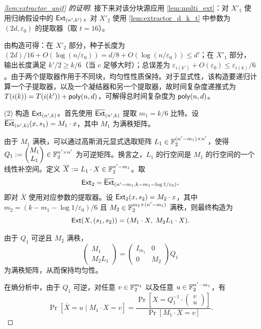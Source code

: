 \begin{proof}[\cref{lem:extractor_unif} 的证明]
    接下来对该分块源应用 \cref{lem:multi_ext}：对 $X'_1$ 使用归纳假设中的 $\mathsf{Ext}_{(n', k')}$，对 $X'_2$ 使用 \cref{lem:extractor_d_k_t} 中参数为 $(2d, \varepsilon_0)$ 的提取器（取 $t=16$）。

    由构造可得：在 $X'_2$ 部分，种子长度为 $(2d)/16 + O(\log(n/\varepsilon_0)) = d / 8 + O(\log (n / \varepsilon_0)) \le d'$；在 $X'_1$ 部分，输出长度满足 $k'/2 \ge k/6$（当 $c$ 足够大时）；总误差为 $\varepsilon_{i(k')} + O(\varepsilon_0) \le \varepsilon_{i(k)}/6$。由于两个提取器作用于不同块，均匀性性质保持。对于显式性，该构造要递归计算一个子提取器，以及一个凝结器和另一个提取器，故时间复杂度递推式为 $T(i(k)) = T(i(k')) + \mathsf{poly}(n, d)$，可解得总时间复杂度为 $\mathsf{poly}(n, d)$。

    (2) 构造 $\mathsf{Ext}_{(n', k)}$。首先使用 $\overline{\mathsf{Ext}}_{(n', k)}$ 提取 $m_1 = k/6$ 比特。设 $\overline{\mathsf{Ext}}_{(n', k)}(x, s_1) = M_1 \cdot x$，其中 $M_1$ 为满秩矩阵。

    由于 $M_1$ 满秩，可以通过高斯消元显式选取矩阵 $L_1 \in \mathbb{F}_2^{(n' - m_1) \times n'}$，使得 $Q_1 := \begin{pmatrix} M_1 \\ L_1 \end{pmatrix} \in \mathbb{F}_2^{n' \times n'}$ 为可逆矩阵。换言之，$L_1$ 的行空间是 $M_1$ 的行空间的一个线性补空间。定义 $\overline{X} := L_1 \cdot X \in \mathbb{F}_2^{n' - m_1}$。取
    $$
    \mathsf{Ext}_2 = \overline{\mathsf{Ext}}_{(n' - m_1, k - m_1 - \log 1 / \varepsilon_0)},
    $$
    即对 $\overline{X}$ 使用对应参数的提取器。设 $\mathsf{Ext}_2(x, s_2) = M_2 \cdot x$，其中 $m_2 = (k - m_1 - \log 1 / \varepsilon_0) / 6$ 且 $M_2 \in \mathbb{F}_2^{m_2 \times (n' - m_1)}$ 满秩，则最终构造为
    $$
    \mathsf{Ext}(X, (s_1, s_2)) = (M_1 \cdot X,\; M_2 L_1 \cdot X).
    $$

    由于 $Q_1$ 可逆且 $M_2$ 满秩，
    $$
    \begin{pmatrix} M_1 \\ M_2 L_1 \end{pmatrix}
    = \begin{pmatrix} I_{m_1} & 0 \\ 0 & M_2 \end{pmatrix} Q_1
    $$
    为满秩矩阵，从而保持均匀性。

    在熵分析中，由于 $Q_1$ 可逆，对任意 $v \in \mathbb{F}_2^{m_1}$ 以及任意 $u \in \mathbb{F}_2^{n' - m_1}$，有
    $$
    \Pr[\overline{X} = u \mid M_1 \cdot X = v]
    = \frac{\Pr\left[X = Q_1^{-1} \cdot \begin{pmatrix} v \\ u \end{pmatrix}\right]}{\Pr[M_1 \cdot X = v]}.
    $$


\end{proof}
